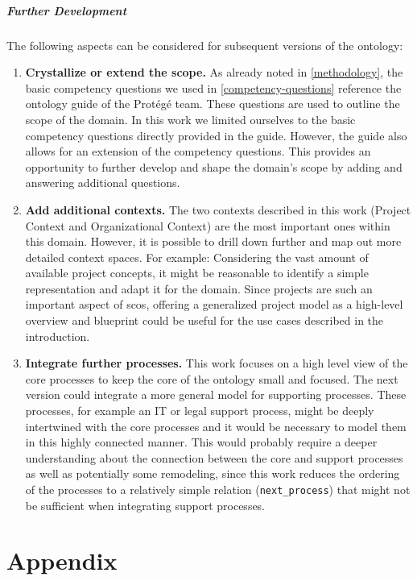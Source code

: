 \documentclass[a4paper, DIV=13, BCOR=0cm]{scrbook}
\newcommand{\relation}[1]{\texttt{#1}}
\begin{document}
\paragraph{Further Development}
The following aspects can be considered for subsequent versions of the ontology:
\begin{enumerate}
	\item \textbf{Crystallize or extend the scope.} As already noted in \autoref{methodology}, the basic competency questions we used in \autoref{competency-questions} reference the ontology guide of the Protégé team. These questions are used to outline the scope of the domain. In this work we limited ourselves to the basic competency questions directly provided in the guide. However, the guide also allows for an extension of the competency questions. This provides an opportunity to further develop and shape the domain's scope by adding and answering additional questions. 
	\item \textbf{Add additional contexts.} The two contexts described in this work (Project Context and Organizational Context) are the most important ones within this domain. However, it is possible to drill down further and map out more detailed context spaces. For example: Considering the vast amount of available project concepts, it might be reasonable to identify a simple representation and adapt it for the domain. Since projects are such an important aspect of \glspl{sco}, offering a generalized project model as a high-level overview and blueprint could be useful for the use cases described in the introduction.
	\item \textbf{Integrate further processes.} This work focuses on a high level view of the core processes to keep the core of the ontology small and focused. The next version could integrate a more general model for supporting processes. These processes, for example an IT or legal support process, might be deeply intertwined with the core processes and it would be necessary to model them in this highly connected manner. This would probably require a deeper understanding about the connection between the core and support processes as well as potentially some remodeling, since this work reduces the ordering of the processes to a relatively simple relation (\relation{next\_process}) that might not be sufficient when integrating support processes.

\end{enumerate}

\appendix
\chapter{Appendix}
\printbibliography
\clearpage
\end{document}

